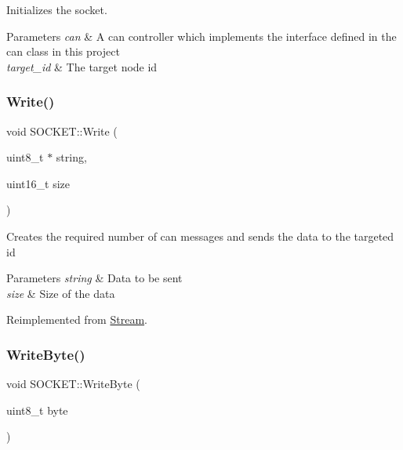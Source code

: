 Initializes the socket. 
\begin{DoxyParams}{Parameters}
{\em can} & A can controller which implements the interface defined in the can class in this project \\
\hline
{\em target\+\_\+id} & The target node id \\
\hline
\end{DoxyParams}
\hypertarget{class_s_o_c_k_e_t_ad8ee6b81c9f30267406412a95264abed}{}\label{class_s_o_c_k_e_t_ad8ee6b81c9f30267406412a95264abed} 
\subsubsection{\texorpdfstring{Write()}{Write()}}
{\footnotesize\ttfamily void S\+O\+C\+K\+E\+T\+::\+Write (\begin{DoxyParamCaption}\item[{uint8\+\_\+t $\ast$}]{string,  }\item[{uint16\+\_\+t}]{size }\end{DoxyParamCaption})\hspace{0.3cm}{\ttfamily [virtual]}}

Creates the required number of can messages and sends the data to the targeted id 
\begin{DoxyParams}{Parameters}
{\em string} & Data to be sent \\
\hline
{\em size} & Size of the data \\
\hline
\end{DoxyParams}


Reimplemented from \hyperlink{class_stream_a508be3423e4d99ab2757275fb723002a}{Stream}.

\hypertarget{class_s_o_c_k_e_t_abcddb460b7adf3595a813f08f3659356}{}\label{class_s_o_c_k_e_t_abcddb460b7adf3595a813f08f3659356} 
\subsubsection{\texorpdfstring{Write\+Byte()}{WriteByte()}}
{\footnotesize\ttfamily void S\+O\+C\+K\+E\+T\+::\+Write\+Byte (\begin{DoxyParamCaption}\item[{uint8\+\_\+t}]{byte }\end{DoxyParamCaption})\hspace{0.3cm}{\ttfamily [virtual]}}

